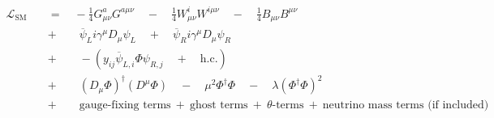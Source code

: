 \documentclass{article}
\begin{document}
\begin{align*}
\mathcal{L}_{\text{SM}}
\quad &= \quad 										%
-\frac{1}{4}G_{\mu\nu}^a G^{a\mu\nu} 				%
\quad - \quad										%
\frac{1}{4}W_{\mu\nu}^i W^{i\mu\nu}					%
\quad - \quad 										%
\frac{1}{4}B_{\mu\nu}B^{\mu\nu} \\					%
&+ \qquad 											%
\overline{\psi}_L i\gamma^\mu D_\mu\psi_L 			%
\quad + \quad 										%
\overline{\psi}_R i\gamma^\mu D_\mu\psi_R \\		%
&+ \qquad 											%
- (y_{ij}\overline{\psi}_{L,i}\Phi\psi_{R,j} 		%
\quad + \quad 										%
\text{h.c.}) \\										%
&+ \qquad 											%
(D_\mu\Phi)^\dagger(D^\mu\Phi) 						%
\quad - \quad 										%
\mu^2\Phi^\dagger\Phi 								%
\quad - \quad  										%
\lambda(\Phi^\dagger\Phi)^2 \\						%
&+ \qquad 
\text{gauge-fixing terms} 							%
\: + \:
\text{ghost terms} 
\: + \:
\theta\text{-terms} 
\: + \:
\text{neutrino mass terms (if included)}
\end{align*}
\end{document}
